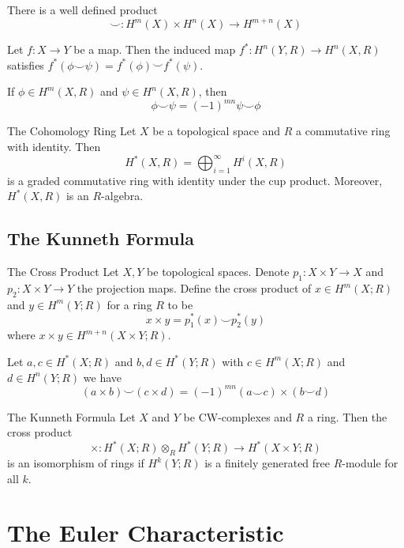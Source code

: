 \documentclass[a4paper]{article}
\begin{document}
\begin{lmm}{}{} There is a well defined product $$\smile:H^m(X)\times H^n(X)\to H^{m+n}(X)$$
\end{lmm}

\begin{lmm}{}{} Let $f:X\to Y$ be a map. Then the induced map $f^\ast:H^n(Y,R)\to H^n(X,R)$ satisfies $f^\ast(\phi\smile\psi)=f^\ast(\phi)\smile f^\ast(\psi)$. 
\end{lmm}

\begin{prp}{}{} If $\phi\in H^m(X,R)$ and $\psi\in H^n(X,R)$, then $$\phi\smile\psi=(-1)^{mn}\psi\smile\phi$$
\end{prp}

\begin{thm}{The Cohomology Ring}{} Let $X$ be a topological space and $R$ a commutative ring with identity. Then $$H^\ast(X,R)=\bigoplus_{i=1}^\infty H^i(X,R)$$ is a graded commutative ring with identity under the cup product. Moreover, $H^\ast(X,R)$ is an $R$-algebra. 
\end{thm}

\subsection{The Kunneth Formula}
\begin{defn}{The Cross Product}{} Let $X,Y$ be topological spaces. Denote $p_1:X\times Y\to X$ and $p_2:X\times Y\to Y$ the projection maps. Define the cross product of $x\in H^m(X;R)$ and $y\in H^m(Y;R)$ for a ring $R$ to be $$x\times y=p_1^\ast(x)\smile p_2^\ast(y)$$ where $x\times y\in H^{m+n}(X\times Y;R)$. 
\end{defn}

\begin{prp}{}{} Let $a,c\in H^\ast(X;R)$ and $b,d\in H^\ast(Y;R)$ with $c\in H^m(X;R)$ and $d\in H^n(Y;R)$ we have $$(a\times b)\smile(c\times d)=(-1)^{mn}(a\smile c)\times(b\smile d)$$
\end{prp}

\begin{thm}{The Kunneth Formula}{} Let $X$ and $Y$ be CW-complexes and $R$ a ring. Then the cross product $$\times:H^\ast(X;R)\otimes_R H^\ast(Y;R)\to H^\ast(X\times Y;R)$$ is an isomorphism of rings if $H^k(Y;R)$ is a finitely generated free $R$-module for all $k$. 
\end{thm}

\pagebreak
\section{The Euler Characteristic}
\end{document}
